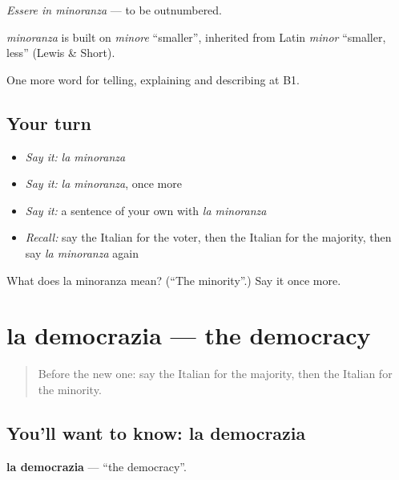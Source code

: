 \emph{Essere in minoranza} — to be outnumbered.

\begin{cousinweb}
\emph{minoranza} is built on \emph{minore} \textquotedblleft{}smaller\textquotedblright{}, inherited from Latin \emph{minor} \textquotedblleft{}smaller, less\textquotedblright{} (Lewis \& Short).
\end{cousinweb}

\begin{grammarlens}[title={What you've built}]
One more word for telling, explaining and describing at B1.
\end{grammarlens}

\subsection*{Your turn}
\begin{itemize}
\raggedright
  \item \emph{Say it:} \emph{la minoranza}
  \item \emph{Say it:} \emph{la minoranza}, once more
  \item \emph{Say it:} a sentence of your own with \emph{la minoranza}
  \item \emph{Recall:} say the Italian for the voter, then the Italian for the majority, then say \emph{la minoranza} again
\end{itemize}

\begin{tcolorbox}[breakable,colback=teal!4,colframe=teal!35!black,title={Before you move on}]
What does la minoranza mean? (\textquotedblleft{}The minority\textquotedblright{}.) Say it once more.
\end{tcolorbox}
\section[la democrazia]{la democrazia — the democracy}

\label{lesson:IT-C370-democrazia}



\begin{quote}
Before the new one: say the Italian for the majority, then the Italian for the minority.
\end{quote}

\subsection*{You'll want to know: la democrazia}
\textbf{la democrazia} — \textquotedblleft{}the democracy\textquotedblright{}.


